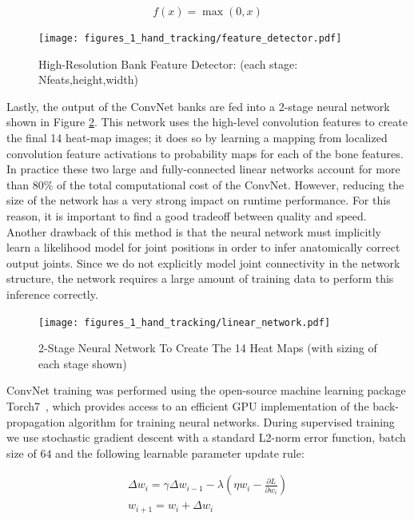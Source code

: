 \begin{equation*}
    f\left(x\right)=\operatorname{max}\left(0,x\right)
\end{equation*}

\begin{figure}[ht]
\centering
\texttt{[image: figures\_1\_hand\_tracking/feature\_detector.pdf]}
    \caption{High-Resolution Bank Feature Detector: (each stage: Nfeats,height,width)}
    \label{fig:feature_detector}
\end{figure}

Lastly, the output of the ConvNet banks are fed into a 2-stage neural network shown in Figure \ref{fig:linear_network}. This network uses the high-level convolution features to create the final 14 heat-map images; it does so by learning a mapping from localized convolution feature activations to probability maps for each of the bone features. In practice these two large and fully-connected linear networks account for more than 80\% of the total computational cost of the ConvNet. However, reducing the size of the network has a very strong impact on runtime performance. For this reason, it is important to find a good tradeoff between quality and speed. Another drawback of this method is that the neural network must implicitly learn a likelihood model for joint positions in order to infer anatomically correct output joints. Since we do not explicitly model joint connectivity in the network structure, the network requires a large amount of training data to perform this inference correctly.

\begin{figure}[ht]
\centering
\texttt{[image: figures\_1\_hand\_tracking/linear\_network.pdf]}
    \caption{2-Stage Neural Network To Create The 14 Heat Maps (with sizing of each stage shown)}
    \label{fig:linear_network}
\end{figure}

ConvNet training was performed using the open-source machine learning package Torch7~\cite{torch7}, which provides access to an efficient GPU implementation of the back-propagation algorithm for training neural networks. During supervised training we use stochastic gradient descent with a standard L2-norm error function, batch size of $64$ and the following learnable parameter update rule:

\begin{align}
    \Delta w_i = \gamma\Delta w_{i-1}-\lambda\left(\eta w_i-\frac{\partial L}{\partial w_i}\right) \nonumber \\
    w_{i+1} = w_i + \Delta w_i
\end{align}

